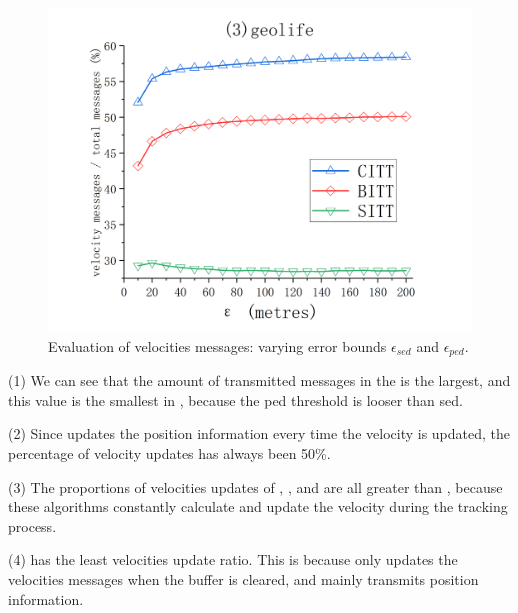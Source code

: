 {\begin{figure}[tb!]
	\includegraphics[scale = 0.210]{figures/Fig-geolife-speed-messages.png}\hspace{1ex}
	\caption{\small Evaluation of velocities messages: varying error bounds $\epsilon_{sed}$ and $\epsilon_{ped}$.}
	\label{fig:speed-message}
\end{figure}


\ni (1) We can see that the amount of transmitted messages in the \ldrh is the largest, and this value is the smallest in \sitt, because the ped threshold is looser than sed.

\ni (2) Since \ldrh updates the position information every time the velocity is updated, the percentage of velocity updates has always been 50\%.

\ni (3) The proportions of velocities updates of \citt, \bitt, and \sitt are all greater than \ldrh, because these algorithms constantly calculate and update the velocity during the tracking process.

\ni (4) \grts has the least velocities update ratio. This is because \grts only updates the velocities messages when the buffer is cleared, and mainly transmits position information.



}
